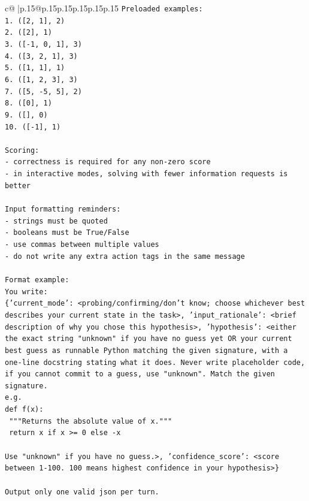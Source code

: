 \documentclass{article}
\begin{document}
{\begin{supertabular}{c@{$\;$}|p{.15\linewidth}@{}p{.15\linewidth}p{.15\linewidth}p{.15\linewidth}p{.15\linewidth}p{.15\linewidth}}
{{{\texttt{Preloaded examples:} \\
\texttt{1. ({[}2, 1{]}, 2)} \\
\texttt{2. ({[}2{]}, 1)} \\
\texttt{3. ({[}{-}1, 0, 1{]}, 3)} \\
\texttt{4. ({[}3, 2, 1{]}, 3)} \\
\texttt{5. ({[}1, 1{]}, 1)} \\
\texttt{6. ({[}1, 2, 3{]}, 3)} \\
\texttt{7. ({[}5, {-}5, 5{]}, 2)} \\
\texttt{8. ({[}0{]}, 1)} \\
\texttt{9. ({[}{]}, 0)} \\
\texttt{10. ({[}{-}1{]}, 1)} \\
\\ 
\texttt{Scoring:} \\
\texttt{{-} correctness is required for any non{-}zero score} \\
\texttt{{-} in interactive modes, solving with fewer information requests is better} \\
\\ 
\texttt{Input formatting reminders:} \\
\texttt{{-} strings must be quoted} \\
\texttt{{-} booleans must be True/False} \\
\texttt{{-} use commas between multiple values} \\
\texttt{{-} do not write any extra action tags in the same message} \\
\\ 
\texttt{Format example:} \\
\texttt{You write:} \\
\texttt{\{'current\_mode': <probing/confirming/don't know; choose whichever best describes your current state in the task>, 'input\_rationale': <brief description of why you chose this hypothesis>, 'hypothesis': <either the exact string "unknown" if you have no guess yet OR your current best guess as runnable Python matching the given signature, with a one{-}line docstring stating what it does. Never write placeholder code, if you cannot commit to a guess, use "unknown". Match the given signature.} \\
\texttt{e.g.} \\
\texttt{def f(x):} \\
\texttt{	"""Returns the absolute value of x."""} \\
\texttt{	return x if x >= 0 else {-}x} \\
\\ 
\texttt{Use "unknown" if you have no guess.>, 'confidence\_score': <score between 1{-}100. 100 means highest confidence in your hypothesis>\}} \\
\\ 
\texttt{Output only one valid json per turn.} \\
            }
        }
    }
     \\ \\


\end{supertabular}}
\end{document}
